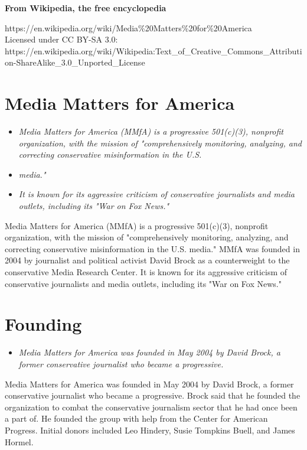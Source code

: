 \textbf{From Wikipedia, the free encyclopedia}

https://en.wikipedia.org/wiki/Media\%20Matters\%20for\%20America\\
Licensed under CC BY-SA 3.0:\\
https://en.wikipedia.org/wiki/Wikipedia:Text\_of\_Creative\_Commons\_Attribution-ShareAlike\_3.0\_Unported\_License

\section{Media Matters for America}\label{media-matters-for-america}

\begin{itemize}
\item
  \emph{Media Matters for America (MMfA) is a progressive 501(c)(3),
  nonprofit organization, with the mission of "comprehensively
  monitoring, analyzing, and correcting conservative misinformation in
  the U.S.}
\item
  \emph{media."}
\item
  \emph{It is known for its aggressive criticism of conservative
  journalists and media outlets, including its "War on Fox News."}
\end{itemize}

Media Matters for America (MMfA) is a progressive 501(c)(3), nonprofit
organization, with the mission of "comprehensively monitoring,
analyzing, and correcting conservative misinformation in the U.S.
media." MMfA was founded in 2004 by journalist and political activist
David Brock as a counterweight to the conservative Media Research
Center. It is known for its aggressive criticism of conservative
journalists and media outlets, including its "War on Fox News."

\section{Founding}\label{founding}

\begin{itemize}
\item
  \emph{Media Matters for America was founded in May 2004 by David
  Brock, a former conservative journalist who became a progressive.}
\end{itemize}

Media Matters for America was founded in May 2004 by David Brock, a
former conservative journalist who became a progressive. Brock said that
he founded the organization to combat the conservative journalism sector
that he had once been a part of. He founded the group with help from the
Center for American Progress. Initial donors included Leo Hindery, Susie
Tompkins Buell, and James Hormel.

